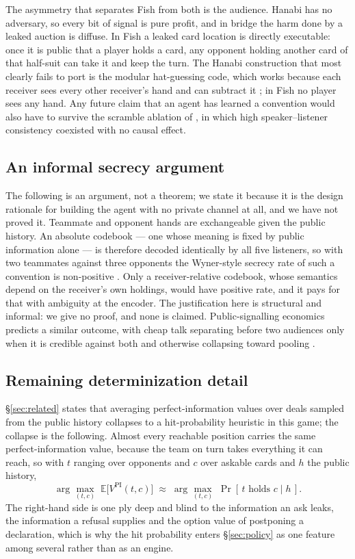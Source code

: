 \documentclass[11pt]{article}
\theoremstyle{definition}
\begin{document}
The asymmetry that separates Fish from both is the audience. Hanabi has no
adversary, so every bit of signal is pure profit, and in bridge the harm done
by a leaked auction is diffuse. In Fish a leaked card location is directly
executable: once it is public that a player holds a card, any opponent holding
another card of that half-suit can take it and keep the turn. The Hanabi
construction that most clearly fails to port is the modular hat-guessing code,
which works because each receiver sees every other receiver's hand and can
subtract it \cite{cox-hanabi}; in Fish no player sees any hand. Any future
claim that an agent has learned a convention would also have to survive the
scramble ablation of \cite{lowe-pitfalls}, in which high speaker--listener
consistency coexisted with no causal effect.

\subsection{An informal secrecy argument}

The following is an argument, not a theorem; we state it because it is the
design rationale for building the agent with no private channel at all, and we
have not proved it. Teammate and opponent hands are exchangeable given the
public history. An absolute codebook --- one whose meaning is fixed by public
information alone --- is therefore decoded identically by all five listeners,
so with two teammates against three opponents the Wyner-style secrecy rate of
such a convention is non-positive \cite{wyner,csiszar-korner}. Only a
receiver-relative codebook, whose semantics depend on the receiver's own
holdings, would have positive rate, and it pays for that with ambiguity at the
encoder. The justification here is structural and informal: we give no proof,
and none is claimed. Public-signalling economics predicts a similar outcome,
with cheap talk separating before two audiences only when it is credible
against both and otherwise collapsing toward pooling \cite{farrell-gibbons}.

\subsection{Remaining determinization detail}

\S\ref{sec:related} states that averaging perfect-information values over deals
sampled from the public history collapses to a hit-probability heuristic in this
game; the collapse is the following. Almost every reachable position carries the
same perfect-information value, because the team on turn takes everything it can
reach, so with $t$ ranging over opponents and $c$ over askable cards and $h$ the
public history,
\[
  \arg\max_{(t,c)} \; \mathbb{E}\bigl[V^{\mathrm{PI}}(t,c)\bigr]
  \;\approx\;
  \arg\max_{(t,c)} \; \Pr[\,t \text{ holds } c \mid h\,].
\]
The right-hand side is one ply deep and blind to the information an ask leaks,
the information a refusal supplies and the option value of postponing a
declaration, which is why the hit probability enters \S\ref{sec:policy} as one
feature among several rather than as an engine.
\end{document}
